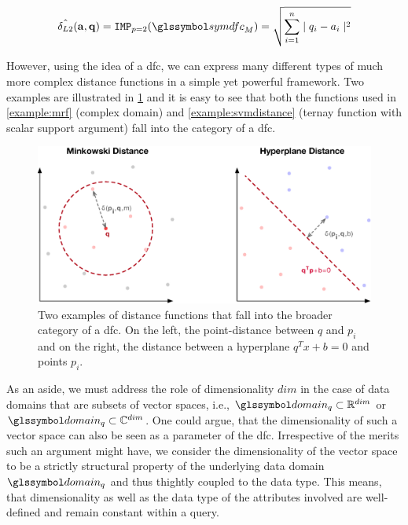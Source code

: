 \begin{equation}
    \hat{\delta_{L2}}(\mathbf{a},\mathbf{q}) = \texttt{IMP}_{p=2}(\symdfc_M) = \sqrt{\sum_{i=1}^{n} \mid q_i - a_i \mid^2}
\end{equation}

However, using the idea of a \acrshort{dfc}, we can express many different types of much more complex distance functions in a simple yet powerful framework. Two examples are illustrated in \cref{figure:distance_computation} and it is easy to see that both the functions used in \cref{example:mrf} (complex domain) and \cref{example:svmdistance} (ternay function with scalar support argument) fall into the category of a \acrshort{dfc}.

\begin{figure}[bt]
    \centering
    \includegraphics[width=\textwidth]{figures/distance_computations.eps}
    \caption{Two examples of distance functions that fall into the broader category of a \acrshort{dfc}. On the left, the point-distance between $q$ and $p_i$ and on the right, the distance between a hyperplane $q^Tx+b = 0$ and points $p_i$.}
    \label{figure:distance_computation}
\end{figure}

As an aside, we must address the role of dimensionality $dim$ in the case of data domains that are subsets of vector spaces, i.e.,  $\domain_q \subset \mathbb{R}^{dim}$ or $\domain_q \subset \mathbb{C}^{dim}$. One could argue, that the dimensionality of such a vector space can also be seen as a parameter of the \acrshort{dfc}. Irrespective of the merits such an argument might have, we consider the dimensionality of the vector space to be a strictly structural property of the underlying data domain $\domain_q$ and thus thightly coupled to the data type. This means, that dimensionality as well as the data type of the attributes involved are well-defined and remain constant within a query.

